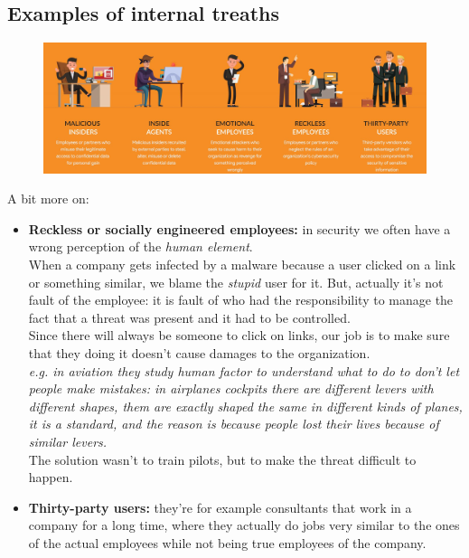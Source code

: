         \subsection{Examples of internal treaths}
            \begin{figure}[ht!]
                \centering
                \includegraphics[width=\linewidth]{internaltreaths.png}
            \end{figure}
            A bit more on:
            \begin{itemize}
                \item \textbf{Reckless or socially engineered employees:}   in security we often have a wrong perception of the \textit{human element}.\\
                                                                            When a company gets infected by a malware because a user clicked on a link or something similar, we blame the \textit{stupid} user for it. But, actually it's not fault of the employee: it is fault of who had the responsibility to manage the fact that a threat was present and it had to be controlled.\\
                                                                            Since there will always be someone to click on links, our job is to make sure that they doing it doesn't cause damages to the organization.\\
                                                                            \textit{e.g. in aviation they study human factor to understand what to do to don't let people make mistakes: in airplanes cockpits there are different levers with different shapes, them are exactly shaped the same in different kinds of planes, it is a standard, and the reason is because people lost their lives because of similar levers.}\\
                                                                            The solution wasn't to train pilots, but to make the threat difficult to happen.
                \item \textbf{Thirty-party users:} they're for example consultants that work in a company for a long time, where they actually do jobs very similar to the ones of the actual employees while not being true employees of the company.
            \end{itemize}
\newpage
